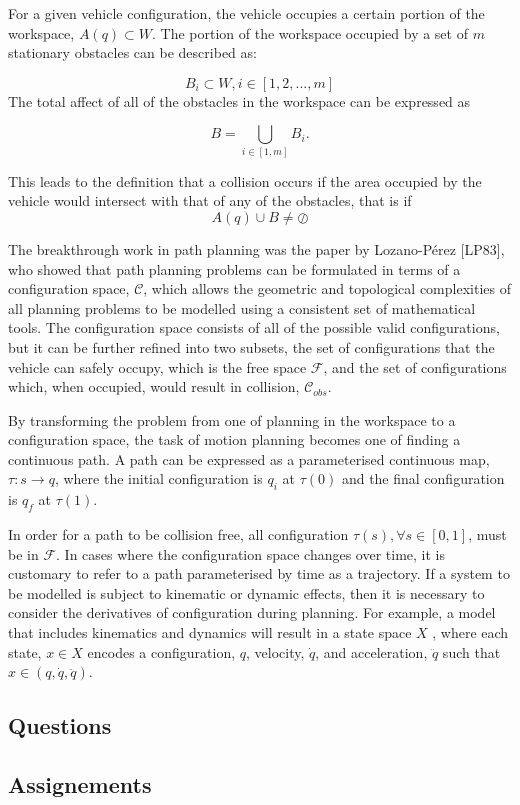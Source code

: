For a given vehicle configuration, the vehicle occupies a certain portion of the workspace,
$A(q) \subset W$. The portion of the workspace occupied by a set of $m$ stationary obstacles can
be described as:

\begin{equation}
B_i \subset W, i \in [1, 2, ..., m]
\end{equation}
The total affect of all of the obstacles in the workspace can be expressed as 

\begin{equation}
B = \bigcup_{i \in [1,m]} B_i. 
\end{equation}

This leads to the definition that a collision occurs if the area occupied by the vehicle would intersect with that of any of the obstacles, that
is if 
\begin{equation}
A(q) \cup B \neq \oslash
\end{equation}


The breakthrough work in path planning was the paper by Lozano-Pérez [LP83], who
showed that path planning problems can be formulated in terms of a configuration space,
$\mathcal{C}$, which allows the geometric and topological complexities of all planning problems to be
modelled using a consistent set of mathematical tools. The configuration space consists of all
of the possible valid configurations, but it can be further refined into two subsets, the set of
configurations that the vehicle can safely occupy, which is the free space $\mathcal{F}$, and the set of
configurations which, when occupied, would result in collision, $\mathcal{C}_{obs}$.

By transforming the problem from one of planning in the workspace to a configuration
space, the task of motion planning becomes one of finding a continuous path. A path can be
expressed as a parameterised continuous map, $\tau: s \rightarrow q$, where the initial configuration is
$q_i$ at $\tau(0)$ and the final configuration is $q_f$ at $\tau(1)$. 

In order for a path to be collision free, all configuration $\tau(s), \forall s \in [0, 1]$, must be in $\mathcal{F}$. 
In cases where the configuration space changes over time, it is customary to refer to a path parameterised by time as a trajectory.
If a system to be modelled is subject to kinematic or dynamic effects, then it is necessary to
consider the derivatives of configuration during planning. For example, a model that includes
kinematics and dynamics will result in a state space $X$ , where each state, $x \in X$ encodes a
configuration, $q$, velocity, $\dot{q}$, and acceleration, $\ddot{q}$ such that $x \in (q, \dot{q}, \ddot{q})$.

\subsection{Questions}
\subsection{Assignements}
